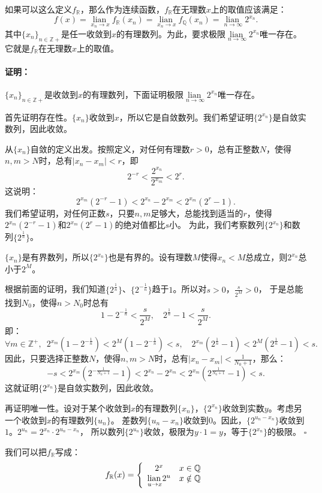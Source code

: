\documentclass[12pt,UTF8]{ctexbook}
\newcommand\lian[1]{
    \underset{#1}{\operatorname{lian}\,}
}
\renewenvironment{proof}{\paragraph{\textbf{证明：}}}{\hfill$\square$}
\begin{document}
如果可以这么定义$f_{\mathbb{R}}$，那么作为连续函数，$f_{\mathbb{R}}$在无理数$x$上的取值应该满足：
$$  f(x) = \lian{x_n \to x}f_{\mathbb{R}}( x_n) = \lian{x_n \to x}f_{\mathbb{Q}}(x_n) = \lian{n \to \infty} 2^{x_n}. $$
其中$\{x_n\}_{n\in\mathbb{Z}+}$是任一收敛到$x$的有理数列。为此，要求极限$\lian{n \to \infty} 2^{x_n}$唯一存在。它就是$f_{\mathbb{R}}$在无理数$x$上的取值。

\begin{proof}
    $\{x_n\}_{n\in\mathbb{Z}+}$是收敛到$x$的有理数列，下面证明极限$\lian{n \to \infty} 2^{x_n}$唯一存在。

    首先证明存在性。$\{x_n\}$收敛到$x$，所以它是自敛数列。我们希望证明$\{2^{x_n}\}$是自敛实数列，因此收敛。

    从$\{x_n\}$自敛的定义出发。按照定义，对任何有理数$r>0$，总有正整数$N$，使得$n,m>N$时，总有$|x_n - x_m| < r$，即
    $$2^{-r} < \frac{2^{x_n}}{2^{x_m}} < 2^r.$$
    这说明：
    $$ 2^{x_m}(2^{-r} - 1) < 2^{x_n} - 2^{x_m} < 2^{x_m}(2^r - 1).$$
    我们希望证明，对任何正数$s$，只要$n,m$足够大，总能找到适当的$r$，使得$2^{x_m}(2^{-r} - 1)$和$2^{x_m}(2^r - 1)$的绝对值都比$s$小。
    为此，我们考察数列$\{2^{x_n}\}$和数列$\{2^{\frac{1}{n}}\}$。
    
    $\{x_n\}$是有界数列，所以$\{2^{x_n}\}$也是有界的。设有理数$M$使得$x_n < M$总成立，则$2^{x_n}$总小于$2^M$。
    
    根据前面的证明，我们知道$\{2^{\frac{1}{n}}\}$、$\{2^{-\frac{1}{n}}\}$趋于$1$。所以对$s>0$，$\frac{s}{2^M}>0$，
    于是总能找到$N_0$，使得$n>N_0$时总有
    $$ 1 - 2^{-\frac{1}{n}} < \frac{s}{2^M}, \quad 2^\frac{1}{n} - 1 < \frac{s}{2^M}. $$
    即：
    $$ \forall m\in\mathbb{Z}^+, \,\,\, 2^{x_m}(1 - 2^{-\frac{1}{n}}) < 2^M(1 - 2^{-\frac{1}{n}}) < s, \quad 2^{x_m}(2^\frac{1}{n} - 1) < 2^M(2^\frac{1}{n} - 1) < s. $$
    因此，只要选择正整数$N$，使得$n,m>N$时，总有$|x_n - x_m| < \frac{1}{N_0+1}$，那么：
    $$ -s < 2^{x_m}(2^{-\frac{1}{N_0+1}} - 1) < 2^{x_n} - 2^{x_m} < 2^{x_m}(2^\frac{1}{N_0+1} - 1) < s.$$
    这就证明$\{2^{x_n}\}$是自敛实数列，因此收敛。

    再证明唯一性。设对于某个收敛到$x$的有理数列$\{x_n\}$，$\{2^{x_n}\}$收敛到实数$y$。考虑另一个收敛到$x$的有理数列$\{u_n\}$。
    差数列$\{u_n - x_n\}$收敛到$0$。因此，$\{2^{u_n - x_n}\}$收敛到$1$。$2^{u_n} = 2^{x_n} \cdot 2^{u_n - x_n}$，
    所以数列$\{2^{u_n}\}$收敛，极限为$y \cdot 1 = y$，等于$\{2^{x_n}\}$的极限。
\end{proof}

我们可以把$f_{\mathbb{R}}$写成：
$$
    f_{\mathbb{R}} (x) = \left\{\begin{array}[]{cc}
        2^x & x\in\mathbb{Q} \\
        \lian{u \to x} 2^u & x \notin \mathbb{Q}
    \end{array}\right.
$$
\end{document}
